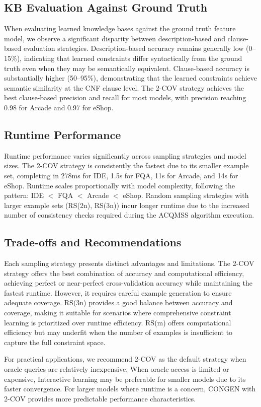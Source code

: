 \documentclass[11pt]{article}
\begin{document}
\subsection{KB Evaluation Against Ground Truth}

When evaluating learned knowledge bases against the ground truth feature model, we observe a significant disparity between description-based and clause-based evaluation strategies. Description-based accuracy remains generally low (0--15\%), indicating that learned constraints differ syntactically from the ground truth even when they may be semantically equivalent. Clause-based accuracy is substantially higher (50--95\%), demonstrating that the learned constraints achieve semantic similarity at the CNF clause level. The 2-COV strategy achieves the best clause-based precision and recall for most models, with precision reaching 0.98 for Arcade and 0.97 for eShop.

\subsection{Runtime Performance}

Runtime performance varies significantly across sampling strategies and model sizes. The 2-COV strategy is consistently the fastest due to its smaller example set, completing in 278ms for IDE, 1.5s for FQA, 11s for Arcade, and 14s for eShop. Runtime scales proportionally with model complexity, following the pattern: IDE $<$ FQA $<$ Arcade $<$ eShop. Random sampling strategies with larger example sets (RS(2n), RS(3n)) incur longer runtime due to the increased number of consistency checks required during the ACQMSS algorithm execution.

\subsection{Trade-offs and Recommendations}

Each sampling strategy presents distinct advantages and limitations. The 2-COV strategy offers the best combination of accuracy and computational efficiency, achieving perfect or near-perfect cross-validation accuracy while maintaining the fastest runtime. However, it requires careful example generation to ensure adequate coverage. RS(3n) provides a good balance between accuracy and coverage, making it suitable for scenarios where comprehensive constraint learning is prioritized over runtime efficiency. RS(m) offers computational efficiency but may underfit when the number of examples is insufficient to capture the full constraint space.

For practical applications, we recommend 2-COV as the default strategy when oracle queries are relatively inexpensive. When oracle access is limited or expensive, Interactive learning may be preferable for smaller models due to its faster convergence. For larger models where runtime is a concern, CONGEN with 2-COV provides more predictable performance characteristics.
\end{document}
